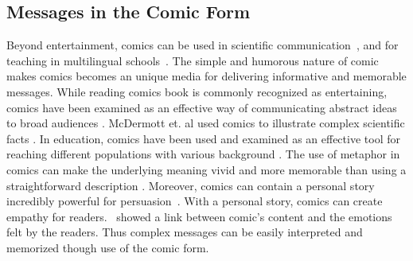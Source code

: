 \subsection{Messages in the Comic Form}
Beyond entertainment, comics can be used in scientific communication~\cite{McDermottPB18}, and for teaching in multilingual schools~\cite{cary2004going}.
The simple and humorous nature of comic makes comics becomes an unique media for delivering informative and memorable messages. While reading comics book is commonly recognized as entertaining, comics have been examined as an effective way of communicating abstract ideas to broad audiences \cite{McDermottPB18,cary2004going,scott1993understanding}. McDermott et. al used comics to illustrate complex scientific facts \cite{McDermottPB18}. In education, comics have been used and examined as an effective tool for reaching different populations with various background \cite{McDermottPB18,cary2004going,scott1993understanding}.
 The use of metaphor in comics can make the underlying meaning vivid and more memorable than using a straightforward description \cite{McDermottPB18,scott1993understanding}. Moreover, comics can contain a personal story incredibly powerful for persuasion~\cite{weaver2017losing}. With a personal story, comics can create empathy for readers.~\textcite{matsubara2016emotional} showed a link between comic's content and the emotions felt by the readers. Thus complex messages can be easily interpreted and memorized though use of the comic form.

